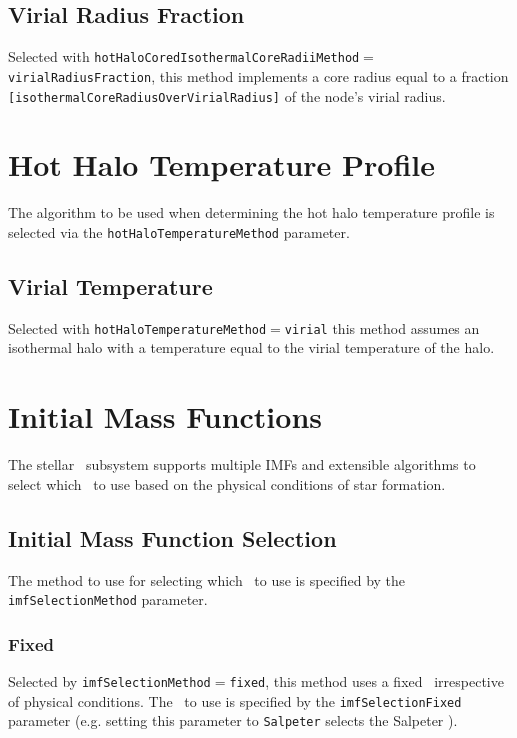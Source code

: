 \subsection{Virial Radius Fraction}

Selected with {\tt hotHaloCoredIsothermalCoreRadiiMethod}$=${\tt virialRadiusFraction}, this method implements a core radius equal to a fraction {\tt [isothermalCoreRadiusOverVirialRadius]} of the node's virial radius.

\section{Hot Halo Temperature Profile}\label{sec:HotHaloTemperature}

The algorithm to be used when determining the hot halo temperature profile is selected via the {\tt hotHaloTemperatureMethod} parameter.

\subsection{Virial Temperature}

Selected with {\tt hotHaloTemperatureMethod}$=${\tt virial} this method assumes an isothermal halo with a temperature equal to the virial temperature of the halo.

\section{Initial Mass Functions}

The stellar \IMF\ subsystem supports multiple IMFs and extensible algorithms to select which \IMF\ to use based on the physical conditions of star formation.

\subsection{Initial Mass Function Selection}

The method to use for selecting which \IMF\ to use is specified by the {\tt imfSelectionMethod} parameter.

\subsubsection{Fixed}

Selected by {\tt imfSelectionMethod}$=${\tt fixed}, this method uses a fixed \IMF\ irrespective of physical conditions. The \IMF\ to use is specified by the {\tt imfSelectionFixed} parameter (e.g. setting this parameter to {\tt Salpeter} selects the Salpeter \IMF).

